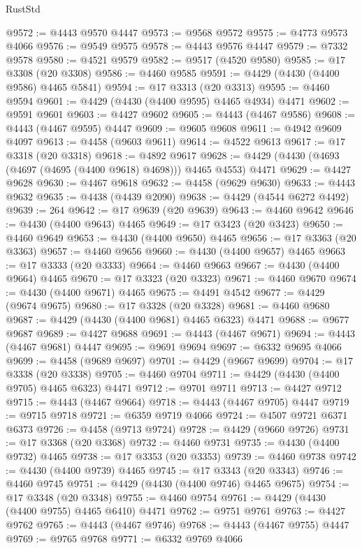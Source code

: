 \begin{lexlean}{RustStd}
\begin{coremodule}
{\begin{coremodule}
{{{{{{{{{{{{{{{{{{{{{{{{{{{{{{{{{{{{{{{{{{{{{{{{{{{{{{{{{{{{{{{{{{{{@9572 := @4443 @9570 @4447
@9573 := @9568 @9572
@9575 := @4773 @9573 @4066
@9576 := @9549 @9575
@9578 := @4443 @9576 @4447
@9579 := @7332 @9578
@9580 := @4521 @9579
@9582 := @9517 (@4520 @9580)
@9585 := @17 @3308 (@20 @3308)
@9586 := @4460 @9585
@9591 := @4429 (@4430 (@4400 @9586) @4465 @5841)
@9594 := @17 @3313 (@20 @3313)
@9595 := @4460 @9594
@9601 := @4429 (@4430 (@4400 @9595) @4465 @4934) @4471
@9602 := @9591 @9601
@9603 := @4427 @9602
@9605 := @4443 (@4467 @9586)
@9608 := @4443 (@4467 @9595) @4447
@9609 := @9605 @9608
@9611 := @4942 @9609 @4097
@9613 := @4458 (@9603 @9611)
@9614 := @4522 @9613
@9617 := @17 @3318 (@20 @3318)
@9618 := @4892 @9617
@9628 := @4429 (@4430 (@4693 (@4697 (@4695 (@4400 @9618) @4698))) @4465 @4553) @4471
@9629 := @4427 @9628
@9630 := @4467 @9618
@9632 := @4458 (@9629 @9630)
@9633 := @4443 @9632
@9635 := @4438 (@4439 @2090)
@9638 := @4429 (@4544 @6272 @4492)
@9639 := 264
@9642 := @17 @9639 (@20 @9639)
@9643 := @4460 @9642
@9646 := @4430 (@4400 @9643) @4465
@9649 := @17 @3423 (@20 @3423)
@9650 := @4460 @9649
@9653 := @4430 (@4400 @9650) @4465
@9656 := @17 @3363 (@20 @3363)
@9657 := @4460 @9656
@9660 := @4430 (@4400 @9657) @4465
@9663 := @17 @3333 (@20 @3333)
@9664 := @4460 @9663
@9667 := @4430 (@4400 @9664) @4465
@9670 := @17 @3323 (@20 @3323)
@9671 := @4460 @9670
@9674 := @4430 (@4400 @9671) @4465
@9675 := @4491 @4542
@9677 := @4429 (@9674 @9675)
@9680 := @17 @3328 (@20 @3328)
@9681 := @4460 @9680
@9687 := @4429 (@4430 (@4400 @9681) @4465 @6323) @4471
@9688 := @9677 @9687
@9689 := @4427 @9688
@9691 := @4443 (@4467 @9671)
@9694 := @4443 (@4467 @9681) @4447
@9695 := @9691 @9694
@9697 := @6332 @9695 @4066
@9699 := @4458 (@9689 @9697)
@9701 := @4429 (@9667 @9699)
@9704 := @17 @3338 (@20 @3338)
@9705 := @4460 @9704
@9711 := @4429 (@4430 (@4400 @9705) @4465 @6323) @4471
@9712 := @9701 @9711
@9713 := @4427 @9712
@9715 := @4443 (@4467 @9664)
@9718 := @4443 (@4467 @9705) @4447
@9719 := @9715 @9718
@9721 := @6359 @9719 @4066
@9724 := @4507 @9721 @6371 @6373
@9726 := @4458 (@9713 @9724)
@9728 := @4429 (@9660 @9726)
@9731 := @17 @3368 (@20 @3368)
@9732 := @4460 @9731
@9735 := @4430 (@4400 @9732) @4465
@9738 := @17 @3353 (@20 @3353)
@9739 := @4460 @9738
@9742 := @4430 (@4400 @9739) @4465
@9745 := @17 @3343 (@20 @3343)
@9746 := @4460 @9745
@9751 := @4429 (@4430 (@4400 @9746) @4465 @9675)
@9754 := @17 @3348 (@20 @3348)
@9755 := @4460 @9754
@9761 := @4429 (@4430 (@4400 @9755) @4465 @6410) @4471
@9762 := @9751 @9761
@9763 := @4427 @9762
@9765 := @4443 (@4467 @9746)
@9768 := @4443 (@4467 @9755) @4447
@9769 := @9765 @9768
@9771 := @6332 @9769 @4066
}}}}}}}}}}}}}}}}}}}}}}}}}}}}}}}}}}}}}}}}}}}}}}}}}}}}}}}}}}}}}}}}}}}}
\end{coremodule}}
\end{coremodule}
\end{lexlean}
